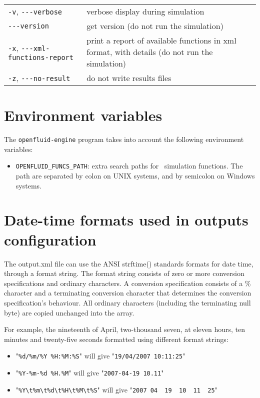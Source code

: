 \begin{center}
\begin{tabularx}{\linewidth}{lX}
\texttt{-v}, \verb?---?\texttt{verbose}&verbose display during simulation\\
\verb?---?\texttt{version}&get version (do not run the simulation)\\
\texttt{-x}, \verb?---?\texttt{xml-functions-report}&print a report of available functions in xml format, with details (do not run the simulation)\\
\texttt{-z}, \verb?---?\texttt{no-result}&do not write results files\\
\end{tabularx}
\end{center}

\section{Environment variables}

The \texttt{openfluid-engine} program takes into account the following environment
variables:
\begin{itemize}
\item \texttt{OPENFLUID\_FUNCS\_PATH}: extra search paths for \OFEname \ simulation functions. The path are separated by colon on UNIX systems, and by semicolon on Windows systems. 
\end{itemize}


\section{Date-time formats used in outputs configuration}

The output.xml file can use the ANSI strftime() standards formats for date time, through a format string. 
The format string consists of zero or more conversion specifications and ordinary characters.
A conversion specification consists of a \% character and a terminating conversion character that determines the conversion specification's behaviour.
All ordinary characters (including the terminating null byte) are copied unchanged into the array.

\bigskip

For example, the nineteenth of April, two-thousand seven, at eleven hours, ten minutes and twenty-five seconds formatted using different format strings:
\begin{itemize}
\item "\verb|%d/%m/%Y %H:%M:%S|" will give "\verb|19/04/2007 10:11:25|"
\item "\verb|%Y-%m-%d %H.%M|" will give "\verb|2007-04-19 10.11|"
\item "\verb|%Y\t%m\t%d\t%H\t%M\t%S|" will give "\verb|2007	04	19	10	11	25|"
\end{itemize}

